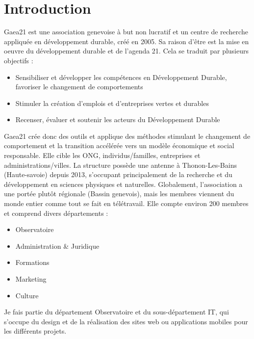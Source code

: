 \section*{Introduction} 
{}
\thispagestyle{noTitledHeader}


Gaea21 est une association genevoise à but non lucratif et un centre de recherche appliquée en développement durable, créé en 2005.
Sa raison d'être est la mise en oeuvre du développement durable et de l'agenda 21. Cela se traduit par plusieurs objectifs :
\begin{itemize}
    \item Sensibiliser et développer les compétences en Développement Durable, favoriser le changement
    de comportements 
    \item Stimuler la création d’emplois et d’entreprises vertes et durables
    \item Recenser, évaluer et soutenir les acteurs du Développement Durable
\end{itemize}

\bigbreak
Gaea21 crée donc des outils et applique des méthodes stimulant le changement de comportement et la transition
accélérée vers un modèle économique et social responsable.
Elle cible les ONG, individus/familles, entreprises et administrations/villes.
\bigbreak
La structure possède une antenne à Thonon-Les-Bains (Haute-savoie) depuis 2013, s'occupant principalement de la recherche et du développement en sciences physiques et naturelles.
Globalement, l'association a une portée plutôt régionale (Bassin genevois), mais les membres viennent du monde entier comme tout se fait en télétravail.
\bigbreak
Elle compte environ 200 membres et comprend divers départements :
\begin{itemize}
    \item Observatoire
    \item Administration \& Juridique 
    \item Formations
    \item Marketing
    \item Culture
\end{itemize} 

Je fais partie du département Observatoire et du sous-département IT, qui s'occupe 
du design et de la réalisation des sites web ou applications mobiles pour les différents projets.



